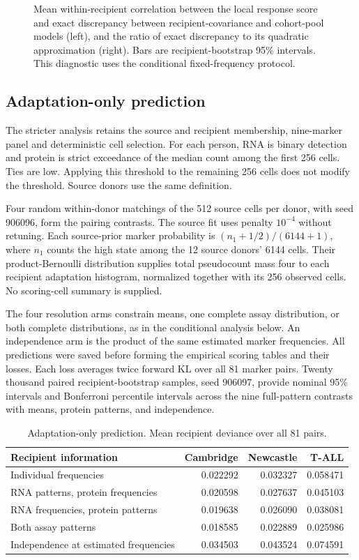 \begin{figure}[htbp]
\centering

\caption{Mean within-recipient correlation between the local response score
and exact discrepancy between recipient-covariance and cohort-pool models
(left), and the ratio of exact discrepancy to its quadratic approximation
(right). Bars are recipient-bootstrap 95\% intervals. This diagnostic uses
the conditional fixed-frequency protocol.}
\end{figure}

\subsection{Adaptation-only prediction}
The stricter analysis retains the source and recipient membership,
nine-marker panel and deterministic cell selection. For each person, RNA is
binary detection and protein is strict exceedance of the median count among
the first 256 cells. Ties are low. Applying this threshold to the remaining
256 cells does not modify the threshold. Source donors use the same definition.

Four random within-donor matchings of the 512 source cells per donor, with
seed 906096, form the pairing contrasts. The source fit uses penalty
$10^{-4}$ without retuning. Each source-prior marker probability is
$(n_1+1/2)/(6144+1)$, where $n_1$ counts the high state among the 12 source
donors' 6144 cells. Their product-Bernoulli distribution supplies total
pseudocount mass four to each recipient adaptation histogram, normalized
together with its 256 observed cells. No scoring-cell summary is supplied.

The four resolution arms constrain means, one complete assay distribution,
or both complete distributions, as in the conditional analysis below. An
independence arm is the product of the same estimated marker frequencies.
All predictions were saved before forming the empirical scoring tables and
their losses. Each loss averages twice forward KL over all 81 marker pairs.
Twenty thousand paired recipient-bootstrap samples, seed 906097, provide
nominal 95\% intervals and Bonferroni percentile intervals across the nine
full-pattern contrasts with means, protein patterns, and independence.

\begin{table}[htbp]
\caption{Adaptation-only prediction. Mean recipient deviance over all 81 pairs.}
\centering\small
\begin{tabularx}{\textwidth}{@{}Yrrr@{}}
\toprule
Recipient information & Cambridge & Newcastle & T-ALL\\
\midrule
Individual frequencies & 0.022292 & 0.032327 & 0.058471\\
RNA patterns, protein frequencies & 0.020598 & 0.027637 & 0.045103\\
RNA frequencies, protein patterns & 0.019638 & 0.026090 & 0.038081\\
Both assay patterns & 0.018585 & 0.022889 & 0.025986\\
Independence at estimated frequencies & 0.034503 & 0.043524 & 0.074591\\
\bottomrule
\end{tabularx}
\end{table}

